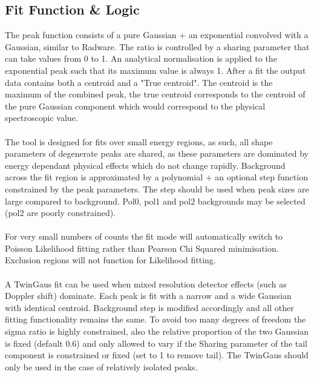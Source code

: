 \documentclass[a4paper,10pt]{article}
\begin{document}
\subsection{Fit Function \& Logic}
The peak function consists of a pure Gaussian + an exponential convolved with a Gaussian, similar to Radware. The ratio is controlled by a sharing parameter that can take values from 0 to 1. An analytical normalisation is applied to the exponential peak such that its maximum value is always 1. After a fit the output data contains both a centroid and a "True centroid". The centroid is the maximum of the combined peak, the true centroid corresponds to the centroid of the pure Gaussian component which would correspond to the physical spectroscopic value.  
\\
\\
The tool is designed for fits over small energy regions, as such, all shape parameters of degenerate peaks are shared, as these parameters are dominated by energy dependant physical effects which do not change rapidly. Background across the fit region is approximated by a polynomial + an optional step function constrained by the peak parameters. The step should be used when peak sizes are large compared to background. Pol0, pol1 and pol2 backgrounds may be selected (pol2 are poorly constrained). 
\\
\\
For very small numbers of counts the fit mode will automatically switch to Poisson Likelihood fitting rather than Pearson Chi Squared minimisation. Exclusion regions will not function for Likelihood fitting.
\\
\\
A TwinGaus fit can be used when mixed resolution detector effects (such as Doppler shift) dominate. Each peak is fit with a narrow and a wide Gaussian with identical centroid. Background step is modified accordingly and all other fitting functionality remains the same. To avoid too many degrees of freedom the sigma ratio is highly constrained, also the relative proportion of the two Gaussian is fixed (default 0.6) and only allowed to vary if the Sharing parameter of the tail component is constrained or fixed (set to 1 to remove tail). The TwinGaus should only be used in the case of relatively isolated peaks.
\end{document}
